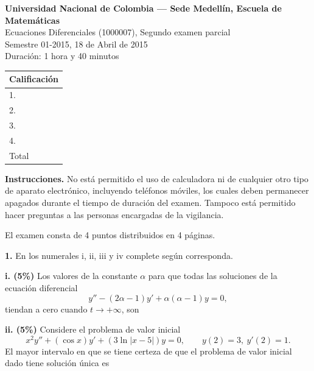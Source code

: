\documentclass[11pt]{article}
\begin{document}
\noindent
\begin{minipage}[t]{0.68\linewidth}
  {\bfseries\large Universidad Nacional de Colombia --- Sede Medellín, Escuela de Matemáticas}\\[2pt]
  {\small Ecuaciones Diferenciales (1000007), Segundo examen parcial}\\
  {\small Semestre 01-2015, 18 de Abril de 2015}\\
  {\small Duración: 1 hora y 40 minutos}
\end{minipage}%
\hfill
\begin{minipage}[t]{0.28\linewidth}
  \raggedleft
  \begin{tabular}{|l|c|}
  \hline
  \multicolumn{2}{|c|}{Calificación} \\
  \hline
  1. & \\ \hline
  2. & \\ \hline
  3. & \\ \hline
  4. & \\ \hline
  Total & \\ \hline
  \end{tabular}
\end{minipage}

\vspace{6pt}
\noindent\textbf{Instrucciones.} No está permitido el uso de calculadora ni de cualquier otro tipo de aparato electrónico, incluyendo teléfonos móviles, los cuales deben permanecer apagados durante el tiempo de duración del examen. Tampoco está permitido hacer preguntas a las personas encargadas de la vigilancia.

\vspace{4pt}
\noindent El examen consta de 4 puntos distribuidos en 4 páginas.

\vspace{6pt}
\noindent\textbf{1.} En los numerales i, ii, iii y iv complete según corresponda.

\vspace{0.3cm}
\noindent\textbf{i. (5\%)} Los valores de la constante $\alpha$ para que todas las soluciones de la ecuación diferencial
\[
y''-(2\alpha-1)y'+\alpha(\alpha-1)y=0,
\]
tiendan a cero cuando $t\to+\infty$, son \underline{\hspace{4cm}}

\vspace{0.3cm}
\noindent\textbf{ii. (5\%)} Considere el problema de valor inicial
\[
x^2y''+(\cos x)y'+(3\ln|x-5|)y=0, \qquad y(2)=3,\ y'(2)=1.
\]
El mayor intervalo en que se tiene certeza de que el problema de valor inicial dado tiene solución única es \underline{\hspace{4cm}}
\end{document}
